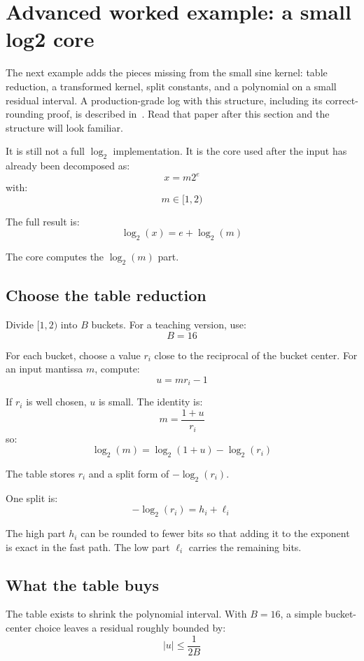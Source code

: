 \documentclass[manuscript, nonacm]{acmart}
\begin{document}
  \section{Advanced worked example: a small log2 core}
  \label{sec:log2}

  The next example adds the pieces missing from the small sine kernel: table
  reduction, a transformed kernel, split constants, and a polynomial on a small
  residual interval. A production-grade log with this structure,
  including its correct-rounding proof, is described in~\cite{dinechinlog}.
  Read that paper after this section and the structure will look familiar.

  It is still not a full $\log_2$ implementation. It is the core used after the
  input has already been decomposed as:
  \[ x = m 2^e \]
  with:
  \[ m \in [1, 2) \]

  The full result is:
  \[ \log_2(x) = e + \log_2(m) \]

  The core computes the $\log_2(m)$ part.

  \subsection{Choose the table reduction}

  Divide $[1, 2)$ into $B$ buckets. For a teaching version, use:
  \[ B = 16 \]

  For each bucket, choose a value $r_i$ close to the reciprocal of the bucket
  center. For an input mantissa $m$, compute:
  \[ u = m r_i - 1 \]

  If $r_i$ is well chosen, $u$ is small. The identity is:
  \[ m = \frac{1 + u}{r_i} \]
  so:
  \[ \log_2(m) = \log_2(1 + u) - \log_2(r_i) \]

  The table stores $r_i$ and a split form of $-\log_2(r_i)$.

  One split is:
  \[ -\log_2(r_i) = h_i + \ell_i \]

  The high part $h_i$ can be rounded to fewer bits so that adding it to the
  exponent is exact in the fast path. The low part $\ell_i$ carries the
  remaining bits.

  \subsection{What the table buys}

  The table exists to shrink the polynomial interval. With $B = 16$, a simple
  bucket-center choice leaves a residual roughly bounded by:
  \[ |u| \le \frac{1}{2B} \]
\end{document}
